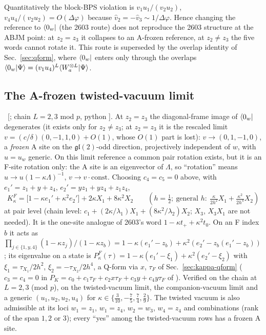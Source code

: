 Quantitatively the block-BPS violation is $v_1u_1/(v_2u_2)$, $v_4u_4/(v_2u_2)=O(\Delta\varphi)$ because $\hat v_2=-\hat v_3\sim1/\Delta\varphi$.
Hence changing the reference to $\langle0_w|$ (the 2603 route) does not reproduce the 2603 structure at the ABJM point: at $z_2=z_3$ it collapses to an A-frozen reference, at $z_2\ne z_3$ the five words cannot rotate it. This route is superseded by the overlap identity of Sec.~\ref{sec:qform}, where $\langle0_w|$ enters only through the overlaps
$\langle0_w|\Psi\rangle=(v_1u_4)^L\langle W_a^{\otimes L}|\Psi\rangle$.

\subsection{The A-frozen twisted-vacuum limit}\label{sec:admiss-frozen}

\ex\ [; chain $L=2,3$ mod $p$, python ]. At $z_2=z_3$ the diagonal-frame image of $\langle0_w|$ degenerates (it exists only for $z_2\ne z_3$; at $z_2=z_3$ it is the rescaled limit $v=(c/\delta)(0,-1,1,0)+O(1)$, whose $O(1)$ part is lost): $v\to(0,1,-1,0)$, a \emph{frozen} A site on the $\mathfrak{gl}(2)$-odd direction, projectively independent of $w$, with $u=u_w$ generic.
On this limit reference a common pair rotation exists, but it is an F-site rotation only: the A site is an eigenvector of $\Lambda$, so ``rotation'' means $u\to u(1-\kappa\Lambda)^{-1}$, $v\to v\cdot\mathrm{const}$. Choosing $c_4=c_5=0$ above, with $e_1'=z_1+y+z_4$, $e_2'=yz_1+yz_4+z_1z_4$,
\begin{equation}\label{eq:admiss-KF}
 K^F_\kappa=\big[1-\kappa e_1'+\kappa^2e_2'\big]+2\kappa X_1+8\kappa^2X_2\qquad(h=\tfrac12;\ \text{general }h:\ \tfrac{\kappa}{2h^2}X_1+\tfrac{\kappa^2}{2h^4}X_2)
\end{equation}
at pair level (chain level: $c_1+(2\kappa/\lambda_1)X_1+(8\kappa^2/\lambda_2)X_2$; $X_3$, $X_3X_1$ are not needed). It is the one-site analogue of 2603's word $1-\kappa t_++\kappa^2t_0$. On an F index $b$ it acts as
$\prod_{j\in\{1,y,4\}}(1-\kappa z_j)/(1-\kappa z_b)=1-\kappa(e_1'-z_b)+\kappa^2(e_2'-z_b(e_1'-z_b))$; its eigenvalue on a state is $P^F_\kappa(\tau)=1-\kappa(e_1'-\xi_1)+\kappa^2(e_2'-\xi_2)$ with $\xi_1=\tau_{X_1}/2h^2$, $\xi_2=-\tau_{X_2}/2h^4$,
a Q-form via $x$, $\tau_F$ of Sec.~\ref{sec:kappa-qform} ($c_3=c_4=0$ in $P_K=c_0+c_1\tau_F+c_2x\tau_F+c_3y+c_4y\tau_F$ of ). Verified on the chain at $L=2,3$ (mod $p$), on the twisted-vacuum limit, the companion-vacuum limit and a generic $(u_1,u_2,u_2,u_4)$ for $\kappa\in\{\tfrac3{10},-\tfrac75,\tfrac74,\tfrac29\}$.
The twisted vacuum is also admissible at its loci $w_1=z_1$, $w_1=z_4$, $w_2=w_3$, $w_4=z_4$ and combinations (rank of the span $1,2$ or $3$); every ``yes'' among the twisted-vacuum rows has a frozen A site.

